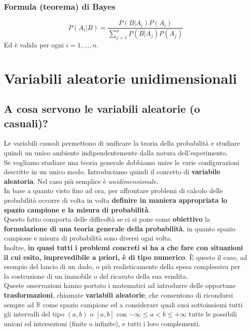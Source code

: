 \subsubsection{Formula (teorema) di Bayes}
\begin{equation}
	P(A_i | B) = \frac{P(B|A_i) P(A_i)}{\sum_{j = 1}^{n} P(B|A_j) P(A_j)}
\end{equation}
Ed è valida per ogni $i = 1, ..., n$.

\section{Variabili aleatorie unidimensionali}
\subsection{A cosa servono le variabili aleatorie (o casuali)?}
Le variabili causali permettono di unificare la teoria della probabilità e studiare quindi un unico ambiente indipendentemente dalla natura dell'esperimento. \\
Se vogliamo studiare una teoria generale dobbiamo unire le varie configurazioni descritte in un unico modo. Introduciamo quindi il concetto di \textbf{variabile aleatoria}. Nel caso più semplice è \textit{unidimensionale}.
\\
In base a quanto visto fino ad ora, per affrontare problemi di calcolo delle probabilità occorre di volta in volta \textbf{definire in maniera appropriata lo spazio campione e la misura di probabilità}. \\
Questo fatto comporta delle difficoltà se ci si pone come \textbf{obiettivo} la \textbf{formulazione di una teoria generale della probabilità}, in quanto spazio campione e misura di probabilità sono diversi ogni volta. \\
Inoltre, \textbf{in quasi tutti i problemi concreti si ha a che fare con situazioni il cui esito, imprevedibile a priori, è di tipo numerico}. È questo il caso, ad esempio del lancio di un dado, o più realisticamente della spesa complessiva per la costruzione di un immobile o del ricavato della sua vendita. \\
Queste osservazioni hanno portato i matematici ad introdurre delle opportune \textbf{trasformazioni}, chiamate \textbf{variabili aleatorie}, che consentono di ricondursi sempre ad $\mathbb{R}$ come spazio campione ed a considerare quali suoi sottoinsiemi tutti gli intervalli del tipo $(a,b)$ o $[a,b]$ con $-\infty \leq a < b \leq +\infty$ tutte le possibili unioni ed intersezioni (finite o infinite), e tutti i loro complementi. \\

